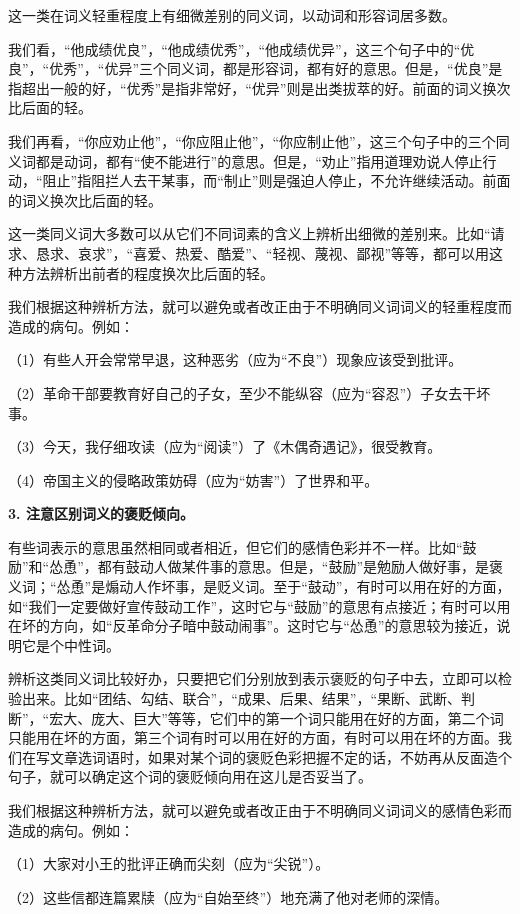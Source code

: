 这一类在词义轻重程度上有细微差别的同义词，以动词和形容词居多数。

我们看，“他成绩优良”，“他成绩优秀”，“他成绩优异”，这三个句子中的“优良”，“优秀”，“优异”三个同义词，都是形容词，都有好的意思。但是，“优良”是指超出一般的好，“优秀”是指非常好，“优异”则是出类拔萃的好。前面的词义换次比后面的轻。

我们再看，“你应劝止他”，“你应阻止他”，“你应制止他”，这三个句子中的三个同义词都是动词，都有“使不能进行”的意思。但是，“劝止”指用道理劝说人停止行动，“阻止”指阻拦人去干某事，而“制止”则是强迫人停止，不允许继续活动。前面的词义换次比后面的轻。

这一类同义词大多数可以从它们不同词素的含义上辨析出细微的差别来。比如“请求、恳求、哀求”，“喜爱、热爱、酷爱”、“轻视、蔑视、鄙视”等等，都可以用这种方法辨析出前者的程度换次比后面的轻。

我们根据这种辨析方法，就可以避免或者改正由于不明确同义词词义的轻重程度而造成的病句。例如：

（1）有些人开会常常早退，这种恶劣（应为“不良”）现象应该受到批评。

（2）革命干部要教育好自己的子女，至少不能纵容（应为“容忍”）子女去干坏事。

（3）今天，我仔细攻读（应为“阅读”）了《木偶奇遇记》，很受教育。

（4）帝国主义的侵略政策妨碍（应为“妨害”）了世界和平。

\textbf{3. 注意区别词义的褒贬倾向。}

有些词表示的意思虽然相同或者相近，但它们的感情色彩并不一样。比如“鼓励”和“怂恿”，都有鼓动人做某件事的意思。但是，“鼓励”是勉励人做好事，是褒义词；“怂恿”是煽动人作坏事，是贬义词。至于“鼓动”，有时可以用在好的方面，如“我们一定要做好宣传鼓动工作”，这时它与“鼓励”的意思有点接近；有时可以用在坏的方向，如“反革命分子暗中鼓动闹事”。这时它与“怂恿”的意思较为接近，说明它是个中性词。

辨析这类同义词比较好办，只要把它们分别放到表示褒贬的句子中去，立即可以检验出来。比如“团结、勾结、联合”，“成果、后果、结果”，“果断、武断、判断”，“宏大、庞大、巨大”等等，它们中的第一个词只能用在好的方面，第二个词只能用在坏的方面，第三个词有时可以用在好的方面，有时可以用在坏的方面。我们在写文章选词语时，如果对某个词的褒贬色彩把握不定的话，不妨再从反面造个句子，就可以确定这个词的褒贬倾向用在这儿是否妥当了。

我们根据这种辨析方法，就可以避免或者改正由于不明确同义词词义的感情色彩而造成的病句。例如：

（1）大家对小王的批评正确而尖刻（应为“尖锐”）。

（2）这些信都连篇累牍（应为“自始至终”）地充满了他对老师的深情。

